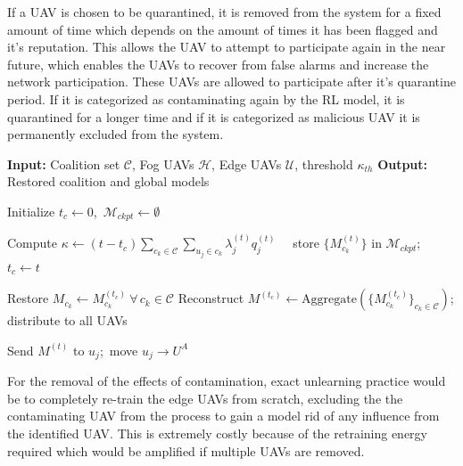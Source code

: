 \documentclass[10pt,journal,compsoc]{IEEEtran}
\begin{document}
If a UAV is chosen to be quarantined, it is removed from the system for a fixed amount of time which depends on the amount of times it has been flagged and it's reputation. This allows the UAV to attempt to participate again in the near future, which enables the UAVs to recover from false alarms and increase the network participation. These UAVs are allowed to participate after it's quarantine period. If it is categorized as contaminating again by the RL model, it is quarantined for a longer time and if it is categorized as malicious UAV it is permanently excluded from the system.

\begin{algorithm}[t]
\caption{Checkpoint-Based Recovery and Model Reconstruction}
\label{alg:checkpoint_recovery}
\begin{algorithmic}[1]
\Statex \textbf{Input:} Coalition set $\mathcal{C}$, Fog UAVs $\mathcal{H}$, Edge UAVs $\mathcal{U}$, threshold $\kappa_{th}$
\Statex \textbf{Output:} Restored coalition and global models

\State Initialize $t_c \leftarrow 0$,\ $\mathcal{M}_{ckpt} \leftarrow \emptyset$

    \State Compute $\kappa \leftarrow (t - t_c)\sum_{c_k \in \mathcal{C}}\sum_{u_j \in c_k} \lambda_j^{(t)} q_j^{(t)}$ 
    \ \ store $\{M_{c_k}^{(t)}\}$ in $\mathcal{M}_{ckpt}$;\ $t_c \leftarrow t$
    \EndIf

     
        \State Restore $M_{c_k} \leftarrow M_{c_k}^{(t_c)}\ \forall\, c_k \in \mathcal{C}$
        \State Reconstruct $M^{(t_c)} \leftarrow \mathrm{Aggregate}\!\left(\{M_{c_k}^{(t_c)}\}_{c_k \in \mathcal{C}}\right)$; distribute to all UAVs
    \EndIf

     
        \State Send $M^{(t)}$ to $u_j$;\ move $u_j \to U^A$
    \EndFor
\EndFor
\end{algorithmic}
\end{algorithm}


For the removal of the effects of contamination, exact unlearning practice would be to completely re-train the edge UAVs from scratch, excluding the the contaminating UAV from the process to gain a model rid of any influence from the identified UAV. This is extremely costly because of the retraining energy required which would be amplified if multiple UAVs are removed.
\end{document}
